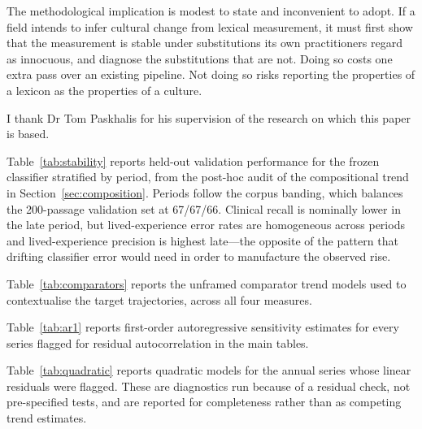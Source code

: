 \documentclass[final]{clv2025}
\begin{document}
The methodological implication is modest to state and inconvenient to adopt. If a field
intends to infer cultural change from lexical measurement, it must first show that the
measurement is stable under substitutions its own practitioners regard as innocuous, and
diagnose the substitutions that are not. Doing so costs one extra pass over an existing
pipeline. Not doing so risks reporting the properties of a lexicon as the properties of a
culture.

\begin{acknowledgments}
I thank Dr Tom Paskhalis for his supervision of the research on which this paper is based.
\end{acknowledgments}

\appendix


Table~\ref{tab:stability} reports held-out validation performance for the frozen classifier
stratified by period, from the post-hoc audit of the compositional trend in
Section~\ref{sec:composition}. Periods follow the corpus banding, which balances the
200-passage validation set at 67/67/66. Clinical recall is nominally lower in the late
period, but lived-experience error rates are homogeneous across periods and
lived-experience precision is highest late---the opposite of the pattern that drifting
classifier error would need in order to manufacture the observed rise.




Table~\ref{tab:comparators} reports the unframed comparator trend models used to
contextualise the target trajectories, across all four measures.




Table~\ref{tab:ar1} reports first-order autoregressive sensitivity estimates for every
series flagged for residual autocorrelation in the main tables.




Table~\ref{tab:quadratic} reports quadratic models for the annual series whose linear
residuals were flagged. These are diagnostics run because of a residual check, not
pre-specified tests, and are reported for completeness rather than as competing trend
estimates.
\end{document}
